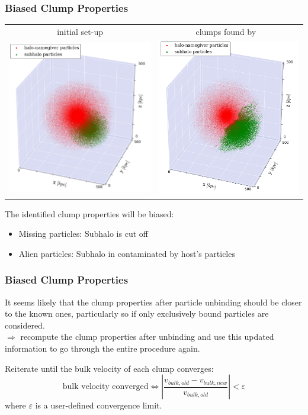 \begin{frame}
	\frametitle{Biased Clump Properties}
	\begin{center}
		\begin{tabular}{c c}
			initial set-up 	& clumps found by \phew\ \\[.5em]
			{\includegraphics[width = .4\textwidth]{../report/images/dice-two/dice-two-original-plot.png}} \hspace*{-1em} 	& 
			{\includegraphics[width = .4\textwidth]{../report/images/dice-two/dice-two-plot-halo1451-phew.png}}
		\end{tabular}
	\end{center}

	The identified clump properties will be biased:
	\begin{itemize}
		\item Missing particles: Subhalo is cut off
		\item Alien particles: Subhalo in contaminated by host's particles
	\end{itemize}
\end{frame}



\begin{frame}
	\frametitle{Biased Clump Properties}
	
	It seems likely that the clump properties after particle unbinding should be closer to the known ones, particularly so if only exclusively bound particles are considered.\\[1em]
	
	$\Rightarrow$  recompute the clump properties after unbinding and use this updated information to go through the entire procedure again.
	
	Reiterate until the bulk velocity of each clump converges:
	\begin{equation*}
	\text{bulk velocity converged} \Leftrightarrow \left | \frac{v_{bulk,old} - v_{bulk,new}}{v_{bulk,old}} \right | < \varepsilon
	\end{equation*}
	where $\varepsilon$ is a user-defined convergence limit.
\end{frame}



